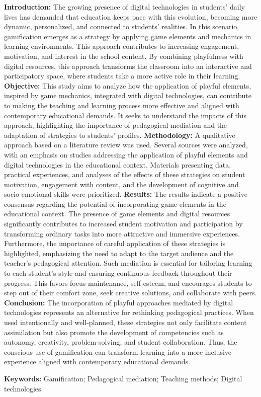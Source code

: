 \documentclass[12pt,a4paper]{article}
\begin{document}
\noindent
\textbf{Introduction:} The growing presence of digital technologies in students' daily lives has demanded that education keeps pace with this evolution, becoming more dynamic, personalized, and connected to students' realities. In this scenario, gamification emerges as a strategy by applying game elements and mechanics in learning environments. This approach contributes to increasing engagement, motivation, and interest in the school content. By combining playfulness with digital resources, this approach transforms the classroom into an interactive and participatory space, where students take a more active role in their learning. \textbf{Objective:} This study aims to analyze how the application of playful elements, inspired by game mechanics, integrated with digital technologies, can contribute to making the teaching and learning process more effective and aligned with contemporary educational demands. It seeks to understand the impacts of this approach, highlighting the importance of pedagogical mediation and the adaptation of strategies to students' profiles. \textbf{Methodology:} A qualitative approach based on a literature review was used. Several sources were analyzed, with an emphasis on studies addressing the application of playful elements and digital technologies in the educational context. Materials presenting data, practical experiences, and analyses of the effects of these strategies on student motivation, engagement with content, and the development of cognitive and socio-emotional skills were prioritized. \textbf{Results:} The results indicate a positive consensus regarding the potential of incorporating game elements in the educational context. The presence of game elements and digital resources significantly contributes to increased student motivation and participation by transforming ordinary tasks into more attractive and immersive experiences. Furthermore, the importance of careful application of these strategies is highlighted, emphasizing the need to adapt to the target audience and the teacher's pedagogical attention. Such mediation is essential for tailoring learning to each student's style and ensuring continuous feedback throughout their progress. This favors focus maintenance, self-esteem, and encourages students to step out of their comfort zone, seek creative solutions, and collaborate with peers. \textbf{Conclusion:} The incorporation of playful approaches mediated by digital technologies represents an alternative for rethinking pedagogical practices. When used intentionally and well-planned, these strategies not only facilitate content assimilation but also promote the development of competencies such as autonomy, creativity, problem-solving, and student collaboration. Thus, the conscious use of gamification can transform learning into a more inclusive experience aligned with contemporary educational demands.

\vspace{1em}

\noindent\textbf{Keywords:} Gamification; Pedagogical mediation; Teaching methods; Digital technologies.
\end{document}
